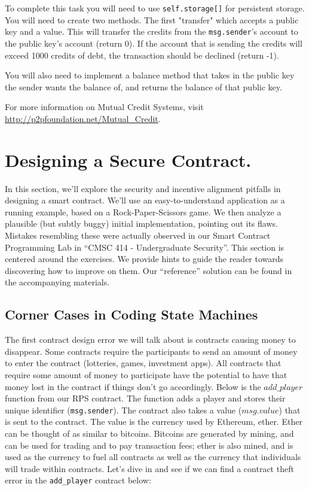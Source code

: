 \documentclass[12pt]{article}
\begin{document}
To complete this task you will need to use \texttt{self.storage[]} for persistent storage. You will need to create two methods. The first "transfer" which accepts a public key and a value. This will transfer the credits from the \texttt{msg.sender}'s account to the public key's account (return 0). If the account that is sending the credits will exceed 1000 credits of debt, the transaction should be declined (return -1). 

You will also need to implement a balance method that takes in the public key the sender wants the balance of, and returns the balance of that public key.

For more information on Mutual Credit Systems, visit \url{http://p2pfoundation.net/Mutual_Credit}.


\section{Designing a Secure Contract.}

In this section, we'll explore the security and incentive alignment pitfalls in designing a smart contract. We'll use an easy-to-understand application as a running example, based on a Rock-Paper-Scissors game. We then analyze a plausible (but subtly buggy) initial implementation, pointing out its flaws. Mistakes resembling these were actually observed in our Smart Contract Programming Lab in ``CMSC 414 - Undergraduate Security''. This section is centered around the exercises. We provide hints to guide the reader towards discovering how to improve on them. Our ``reference'' solution can be found in the accompanying materials.


\subsection{Corner Cases in Coding State Machines}
The first contract design error we will talk about is contracts causing money to disappear. Some contracts require the participants to send an amount of money to enter the contract (lotteries, games, investment apps). All contracts that require some amount of money to participate have the potential to have that money lost in the contract if things don't go accordingly. Below is the $add\_player$ function from our RPS contract. The function adds a player and stores their unique identifier (\texttt{msg.sender}). The contract also takes a value ($msg.value$) that is sent to the contract. The value is the currency used by Ethereum, ether. Ether can be thought of as similar to bitcoins. Bitcoins are generated by mining, and can be used for trading and to pay transaction fees; ether is also mined, and is used as the currency to fuel all contracts as well as the currency that individuals will trade within contracts. Let's dive in and see if we can find a contract theft error in the \texttt{add\_player} contract below: 
\end{document}
